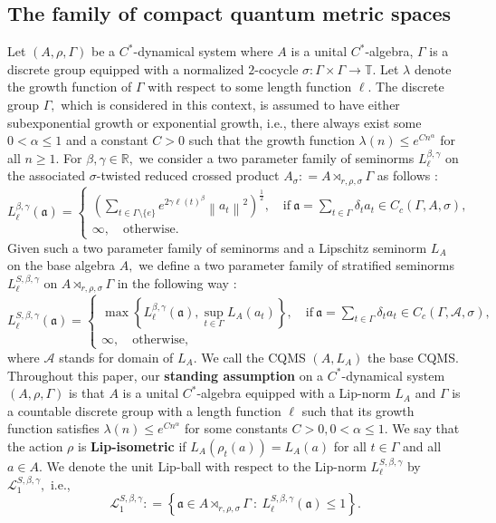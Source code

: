 \documentclass[a4paper,11pt,reqno]{amsart}
\theoremstyle{plain}
\theoremstyle{mainthmstyle}
\theoremstyle{named}
\numberwithin{equation}{section}
\begin{document}
\subsection{The family of compact quantum metric spaces} \label{Lip-norm defn}
Let $(A,\rho,\Gamma)$ be a $C^{\ast}$-dynamical system where $A$ is a unital $C^{\ast}$-algebra, $\Gamma$ is a discrete group equipped with a normalized $2$-cocycle $\sigma : \Gamma \times \Gamma \rightarrow \mathbb T.$  Let $\lambda$ denote the growth function of $\Gamma$ with respect to some length function $\ell.$ The discrete group $\Gamma,$ which is considered in this context, is assumed to have either subexponential growth or exponential growth, i.e., there always exist some $0 < \alpha \leq 1$ and a constant $C > 0$ such that the growth function $\lambda (n) \leq e^{C n^{\alpha}}$ for all $n \geq 1.$ For $\beta, \gamma \in \mathbb R,$ we consider a two parameter family of seminorms $L_{\ell}^{\beta, \gamma}$ on the associated $\sigma$-twisted reduced crossed product $A_{\sigma} : = A \rtimes_{r, \rho, \sigma} \Gamma$ as follows $:$
$$L^{\beta, \gamma}_{\ell} (\mathfrak{a}) = \begin{cases} \left (\sum\limits_{t \in \Gamma \setminus \{e \}} e^{2 \gamma \ell (t)^{\beta}} \left \|a_t \right \|^{2} \right )^{\frac {1} {2}}, \quad \text{if}\ \mathfrak{a} = \sum\limits_{t \in \Gamma} \delta_t a_t \in C_c (\Gamma,  A, \sigma), \\ \infty, \quad \mathrm{otherwise}. \end{cases}$$
Given such a two parameter family of seminorms and a Lipschitz seminorm $L_A$ on the base algebra $A,$ we define a two parameter family of stratified seminorms $L_{\ell}^{S, \beta, \gamma}$ on $A \rtimes_{r, \rho, \sigma} \Gamma$ in the following way $:$
$$L^{S, \beta, \gamma}_{\ell} (\mathfrak{a}) = \begin{cases} \max \left \{L^{\beta, \gamma}_{\ell} (\mathfrak{a}), \sup\limits_{t \in \Gamma} L_A \left (a_t \right ) \right \}, \quad \text {if}\ \mathfrak{a}= \sum\limits_{t \in \Gamma} \delta_t a_t \in C_c (\Gamma, \mathcal A, \sigma), \\ \infty, \quad \mathrm{otherwise}, \end{cases}$$ where $\mathcal A$ stands for domain of $L_A.$ We call the CQMS $(A,L_A)$ the base CQMS. 
Throughout this paper, our {\bf standing assumption} on a $C^{\ast}$-dynamical system $(A,\rho,\Gamma)$ is that $A$ is a unital $C^{\ast}$-algebra equipped with a Lip-norm $L_A$ and $\Gamma$ is a countable discrete group with a length function $\ell$ such that its growth function satisfies $\lambda(n)\leq e^{Cn^{\alpha}}$ for some constants $C>0,0<\alpha\leq 1$. We say that the action $\rho$ is {\bf Lip-isometric} if $L_A(\rho_t(a))=L_A(a)$ for all $t\in\Gamma$ and all $a\in A.$ We denote the unit Lip-ball with respect to the Lip-norm $L_{\ell}^{S, \beta, \gamma}$ by $\mathcal L^{S, \beta, \gamma}_1,$ i.e.,
$$\mathcal L^{S, \beta, \gamma}_1 : = \left \{\mathfrak a \in A \rtimes_{r, \rho, \sigma} \Gamma\ :\ L_{\ell}^{S, \beta, \gamma} (\mathfrak {a}) \leq 1 \right \}.$$
\end{document}
